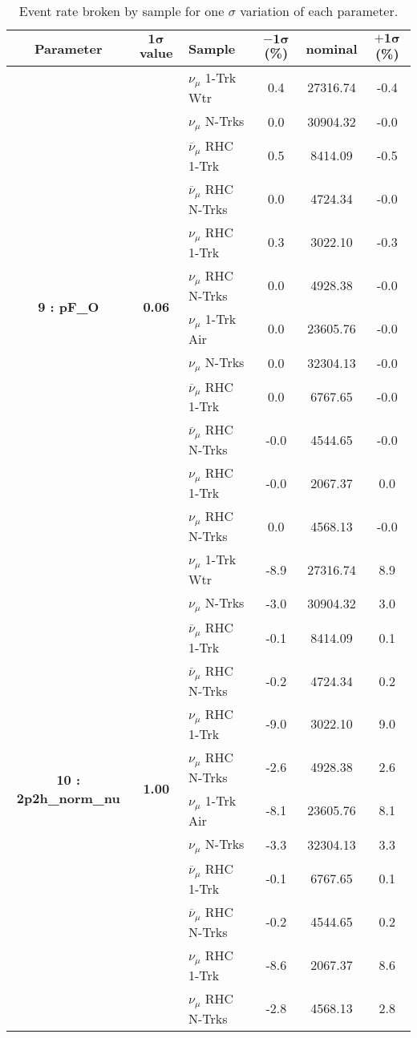 \addtocounter{table}{-1}
\begin{table}[ht!]
\centering
\begin{tabular}{ c  c  l  c  c  c }
\midrule[1.3pt]
\textbf{Parameter} & \textbf{$\mathbf{1\sigma}$ value} & \textbf{Sample} & \textbf{$\mathbf{-1\sigma}$ (\%)}  &  \textbf{nominal}  &  \textbf{$\mathbf{+1\sigma}$ (\%)} \\
\midrule[1.3pt]
\multirow{12}{*}{\textbf{9 : pF\_O}} & \multirow{12}{*}{\textbf{0.06}} & $\nu_\mu$ 1-Trk Wtr &   0.4 &  27316.74 &   -0.4 \\ 
 &  & $\nu_\mu$ N-Trks &   0.0 &  30904.32 &   -0.0 \\ 
 &  & $\overline{\nu}_\mu$ RHC 1-Trk &   0.5 &  8414.09 &   -0.5 \\ 
 &  & $\overline{\nu}_\mu$ RHC N-Trks &   0.0 &  4724.34 &   -0.0 \\ 
 &  & $\nu_\mu$ RHC 1-Trk &   0.3 &  3022.10 &   -0.3 \\ 
 &  & $\nu_\mu$ RHC N-Trks &   0.0 &  4928.38 &   -0.0 \\ 
 &  & $\nu_\mu$ 1-Trk Air &   0.0 &  23605.76 &   -0.0 \\ 
 &  & $\nu_\mu$ N-Trks &   0.0 &  32304.13 &   -0.0 \\ 
 &  & $\overline{\nu}_\mu$ RHC 1-Trk &   0.0 &  6767.65 &   -0.0 \\ 
 &  & $\overline{\nu}_\mu$ RHC N-Trks &   -0.0 &  4544.65 &   -0.0 \\ 
 &  & $\nu_\mu$ RHC 1-Trk &   -0.0 &  2067.37 &   0.0 \\ 
 &  & $\nu_\mu$ RHC N-Trks &   0.0 &  4568.13 &   -0.0 \\ 
\midrule[1.3pt]
\multirow{12}{*}{\textbf{10 : 2p2h\_norm\_nu}} & \multirow{12}{*}{\textbf{1.00}} & $\nu_\mu$ 1-Trk Wtr &   -8.9 &  27316.74 &   8.9 \\ 
 &  & $\nu_\mu$ N-Trks &   -3.0 &  30904.32 &   3.0 \\ 
 &  & $\overline{\nu}_\mu$ RHC 1-Trk &   -0.1 &  8414.09 &   0.1 \\ 
 &  & $\overline{\nu}_\mu$ RHC N-Trks &   -0.2 &  4724.34 &   0.2 \\ 
 &  & $\nu_\mu$ RHC 1-Trk &   -9.0 &  3022.10 &   9.0 \\ 
 &  & $\nu_\mu$ RHC N-Trks &   -2.6 &  4928.38 &   2.6 \\ 
 &  & $\nu_\mu$ 1-Trk Air &   -8.1 &  23605.76 &   8.1 \\ 
 &  & $\nu_\mu$ N-Trks &   -3.3 &  32304.13 &   3.3 \\ 
 &  & $\overline{\nu}_\mu$ RHC 1-Trk &   -0.1 &  6767.65 &   0.1 \\ 
 &  & $\overline{\nu}_\mu$ RHC N-Trks &   -0.2 &  4544.65 &   0.2 \\ 
 &  & $\nu_\mu$ RHC 1-Trk &   -8.6 &  2067.37 &   8.6 \\ 
 &  & $\nu_\mu$ RHC N-Trks &   -2.8 &  4568.13 &   2.8 \\ 
\midrule[1.3pt]
\end{tabular}
\centering
\caption{Event rate broken by sample for one $\sigma$ variation of each parameter.}
\end{table}
